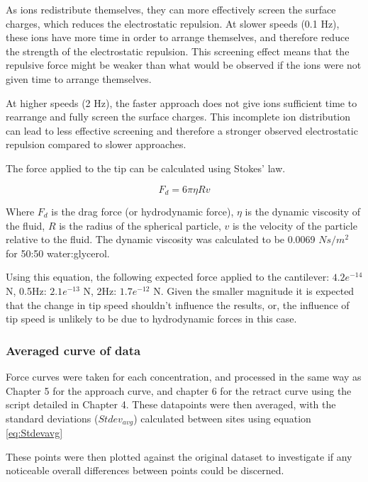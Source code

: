 As ions redistribute themselves, they can more effectively screen the surface charges, which reduces the electrostatic repulsion. At slower speeds (0.1 Hz), these ions have more time in order to arrange themselves, and therefore reduce the strength of the electrostatic repulsion. This screening effect means that the repulsive force might be weaker than what would be observed if the ions were not given time to arrange themselves.

At higher speeds (2 Hz), the faster approach does not give ions sufficient time to rearrange and fully screen the surface charges. This incomplete ion distribution can lead to less effective screening and therefore a stronger observed electrostatic repulsion compared to slower approaches.

The force applied to the tip can be calculated using Stokes' law. \cite{bird2001transport}

\begin{equation} 
F_d = 6 \pi \eta R v
\end{equation}

Where $F_d$ is the drag force (or hydrodynamic force), $\eta$ is the dynamic viscosity of the fluid, $R$ is the radius of the spherical particle, $v$ is the velocity of the particle relative to the fluid. The dynamic viscosity was calculated to be 0.0069 $Ns/m^2$ for 50:50 water:glycerol. \cite{Viscosity1} \cite{Viscosity2}

Using this equation, the following expected force applied to the cantilever: $4.2e^{-14}$ N, 0.5Hz: $2.1e^{-13}$ N, 2Hz: $1.7e^{-12}$ N. Given the smaller magnitude it is expected that the change in tip speed shouldn't influence the results, or, the influence of tip speed is unlikely to be due to hydrodynamic forces in this case.

\subsubsection{Averaged curve of data}

Force curves were taken for each concentration, and processed in the same way as Chapter 5 for the approach curve, and chapter 6 for the retract curve using the script detailed in Chapter 4. These datapoints were then averaged, with the standard deviations ($Stdev_{avg}$) calculated between sites using equation \ref{eq:Stdevavg}

These points were then plotted against the original dataset to investigate if any noticeable overall differences between points could be discerned.

